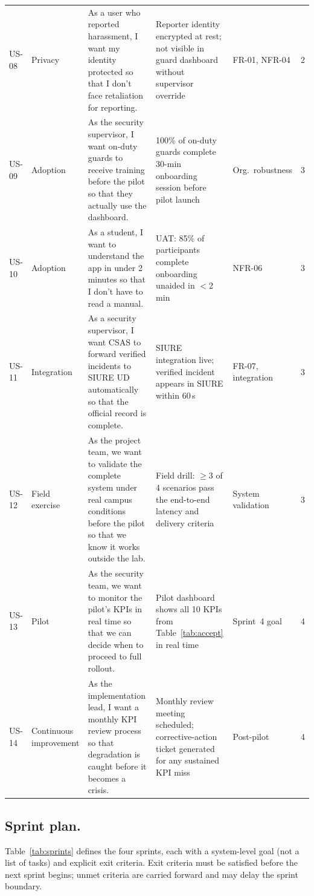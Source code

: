 \documentclass[12pt,a4paper]{article}
\begin{document}
\begin{longtable}{p{0.5cm}p{1.0cm}p{5.0cm}p{3.5cm}p{2.0cm}p{1.5cm}}
US-08 & Privacy & As a user who reported harassment, I want my identity protected so that I don't face retaliation for reporting. & Reporter identity encrypted at rest; not visible in guard dashboard without supervisor override & FR-01, NFR-04 & 2 \\
US-09 & Adoption & As the security supervisor, I want on-duty guards to receive training before the pilot so that they actually use the dashboard. & 100\% of on-duty guards complete 30-min onboarding session before pilot launch & Org.\ robustness & 3 \\
US-10 & Adoption & As a student, I want to understand the app in under 2 minutes so that I don't have to read a manual. & UAT: 85\% of participants complete onboarding unaided in $<$2 min & NFR-06 & 3 \\
US-11 & Integration & As a security supervisor, I want CSAS to forward verified incidents to SIURE UD automatically so that the official record is complete. & SIURE integration live; verified incident appears in SIURE within 60\,s & FR-07, integration & 3 \\
US-12 & Field exercise & As the project team, we want to validate the complete system under real campus conditions before the pilot so that we know it works outside the lab. & Field drill: $\geq$3 of 4 scenarios pass the end-to-end latency and delivery criteria & System validation & 3 \\
US-13 & Pilot & As the security team, we want to monitor the pilot's KPIs in real time so that we can decide when to proceed to full rollout. & Pilot dashboard shows all 10 KPIs from Table~\ref{tab:accept} in real time & Sprint~4 goal & 4 \\
US-14 & Continuous improvement & As the implementation lead, I want a monthly KPI review process so that degradation is caught before it becomes a crisis. & Monthly review meeting scheduled; corrective-action ticket generated for any sustained KPI miss & Post-pilot & 4 \\
\end{longtable}

\subsection{Sprint plan.}
Table~\ref{tab:sprints} defines the four sprints, each with a
system-level goal (not a list of tasks) and explicit exit criteria.
Exit criteria must be satisfied before the next sprint begins;
unmet criteria are carried forward and may delay the sprint
boundary.
\end{document}
